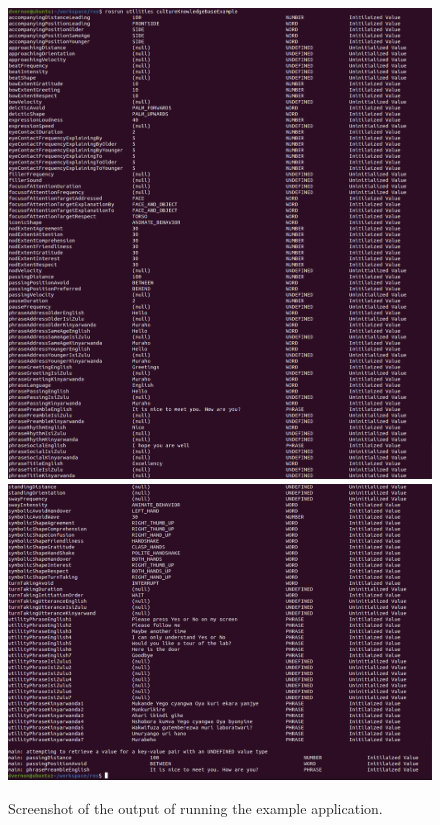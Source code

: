 \documentclass{CSSRforAfrica}
\begin{document}
\begin{figure}[H]
\begin{center}
\includegraphics[width=125mm,angle=0]{screenshot1.png}\\\includegraphics[width=125mm,angle=0]{screenshot2.png}
\end{center}
\caption{Screenshot of  the output of running the example  application.}
\label{fig:screenshot}       
\end{figure}
\end{document}
